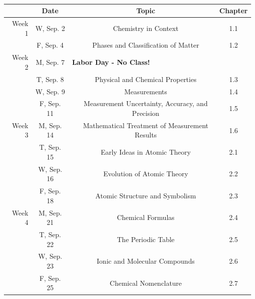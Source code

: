 \documentclass[12pt, letterpaper]{article}
\begin{document}
~
\noindent
\begin{tabular}{rcccc}
	       & Date       &                                                    & Topic                                            & Chapter \\
	\midrule
	Week 1 & W, Sep. 2  &                                                    & Chemistry in Context                             & 1.1     \\
	       & F, Sep. 4  &                                                    & Phases and Classification of Matter              & 1.2     \\
	\midrule
	Week 2 & M, Sep. 7  & \multicolumn{3}{l}{\textbf{Labor Day - No Class!}}                                                              \\
	       & T, Sep. 8  &                                                    & Physical and Chemical Properties                 & 1.3     \\
	       & W, Sep. 9  &                                                    & Measurements                                     & 1.4     \\
	       & F, Sep. 11 &                                                    & Measurement Uncertainty, Accuracy, and Precision & 1.5     \\
	\midrule
	Week 3 & M, Sep. 14 &                                                    & Mathematical Treatment of Measurement Results    & 1.6     \\
	       & T, Sep. 15 &                                                    & Early Ideas in Atomic Theory                     & 2.1     \\
	       & W, Sep. 16 &                                                    & Evolution of Atomic Theory                       & 2.2     \\
	       & F, Sep. 18 &                                                    & Atomic Structure and Symbolism                   & 2.3     \\
	\midrule
	Week 4 & M, Sep. 21 &                                                    & Chemical Formulas                                & 2.4     \\
	       & T, Sep. 22 &                                                    & The Periodic Table                               & 2.5     \\
	       & W, Sep. 23 &                                                    & Ionic and Molecular Compounds                    & 2.6     \\
	       & F, Sep. 25 &                                                    & Chemical Nomenclature                            & 2.7     \\
\end{tabular}
\end{document}
